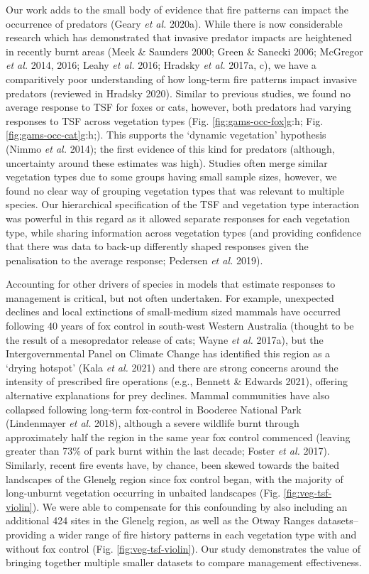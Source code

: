 \documentclass[11pt,a4paper,titlepage,twoside,openright]{style/unimelbthesis}
\begin{document}
\begin{mainmatter}
Our work adds to the small body of evidence that fire patterns can impact the occurrence of predators (Geary \emph{et al.} 2020a). While there is now considerable research which has demonstrated that invasive predator impacts are heightened in recently burnt areas (Meek \& Saunders 2000; Green \& Sanecki 2006; McGregor \emph{et al.} 2014, 2016; Leahy \emph{et al.} 2016; Hradsky \emph{et al.} 2017a, c), we have a comparitively poor understanding of how long-term fire patterns impact invasive predators (reviewed in Hradsky 2020). Similar to previous studies, we found no average response to TSF for foxes or cats, however, both predators had varying responses to TSF across vegetation types (Fig. \ref{fig:gams-occ-fox}g:h; Fig. \ref{fig:gams-occ-cat}g:h;). This supports the `dynamic vegetation' hypothesis (Nimmo \emph{et al.} 2014); the first evidence of this kind for predators (although, uncertainty around these estimates was high). Studies often merge similar vegetation types due to some groups having small sample sizes, however, we found no clear way of grouping vegetation types that was relevant to multiple species. Our hierarchical specification of the TSF and vegetation type interaction was powerful in this regard as it allowed separate responses for each vegetation type, while sharing information across vegetation types (and providing confidence that there was data to back-up differently shaped responses given the penalisation to the average response; Pedersen \emph{et al.} 2019).

Accounting for other drivers of species in models that estimate responses to management is critical, but not often undertaken. For example, unexpected declines and local extinctions of small-medium sized mammals have occurred following 40 years of fox control in south-west Western Australia (thought to be the result of a mesopredator release of cats; Wayne \emph{et al.} 2017a), but the Intergovernmental Panel on Climate Change has identified this region as a `drying hotspot' (Kala \emph{et al.} 2021) and there are strong concerns around the intensity of prescribed fire operations (e.g., Bennett \& Edwards 2021), offering alternative explanations for prey declines. Mammal communities have also collapsed following long-term fox-control in Booderee National Park (Lindenmayer \emph{et al.} 2018), although a severe wildlife burnt through approximately half the region in the same year fox control commenced (leaving greater than 73\% of park burnt within the last decade; Foster \emph{et al.} 2017). Similarly, recent fire events have, by chance, been skewed towards the baited landscapes of the Glenelg region since fox control began, with the majority of long-unburnt vegetation occurring in unbaited landscapes (Fig. \ref{fig:veg-tsf-violin}). We were able to compensate for this confounding by also including an additional 424 sites in the Glenelg region, as well as the Otway Ranges datasets--providing a wider range of fire history patterns in each vegetation type with and without fox control (Fig. \ref{fig:veg-tsf-violin}). Our study demonstrates the value of bringing together multiple smaller datasets to compare management effectiveness.


\end{mainmatter}
\end{document}

